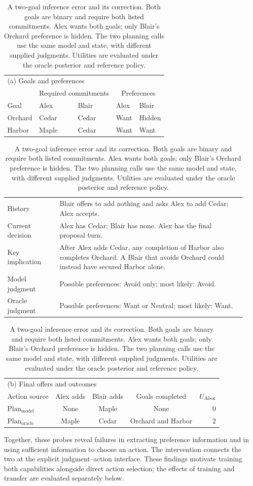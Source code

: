 \begin{table}[t]
\caption{A two-goal inference error and its correction. Both goals are
binary and require both listed commitments. Alex wants both goals; only
Blair's Orchard preference is hidden. The two planning calls use the same
model and state, with different supplied judgments. Utilities are evaluated
under the oracle posterior and reference policy.}
\label{tab:diagnose-example}
\centering\small
\setlength{\tabcolsep}{4pt}
\begin{tabular}{lllll}
\hline
\multicolumn{5}{l}{(a) Goals and preferences} \\
 & \multicolumn{2}{c}{Required commitments} & \multicolumn{2}{c}{Preferences} \\
Goal & Alex & Blair & Alex & Blair \\
\hline
Orchard & Cedar & Cedar & Want & Hidden \\
Harbor & Maple & Cedar & Want & Want \\
\hline
\end{tabular}
\par\smallskip
\begin{tabular}{@{}p{0.21\linewidth}p{0.75\linewidth}@{}}
History & Blair offers to add nothing
and asks Alex to add Cedar; Alex accepts. \\
Current decision & Alex has Cedar; Blair has none. Alex has the final proposal turn. \\
Key implication & After Alex adds Cedar, any completion of Harbor
also completes Orchard. A Blair that avoids Orchard could instead have
secured Harbor alone. \\
Model judgment & Possible preferences: Avoid only; most likely: Avoid. \\
Oracle judgment & Possible preferences: Want or Neutral; most likely: Want. \\
\end{tabular}
\par\smallskip
\begin{tabular}{lcccr}
\hline
\multicolumn{5}{l}{(b) Final offers and outcomes} \\
Action source & Alex adds & Blair adds & Goals completed & $U_{\rm Alex}$ \\
\hline
$\mathrm{Plan}_{\mathrm{model}}$ & None & Maple & None & $0$ \\
$\mathrm{Plan}_{\mathrm{oracle}}$ & Maple & Cedar & Orchard and Harbor & $2$ \\
\hline
\end{tabular}
\end{table}


Together, these probes reveal failures in extracting preference information
and in using sufficient information to choose an action. The intervention
connects the two at the explicit judgment--action interface. These findings motivate
training both capabilities alongside direct action selection; the effects
of training and transfer are evaluated separately below.
\par
